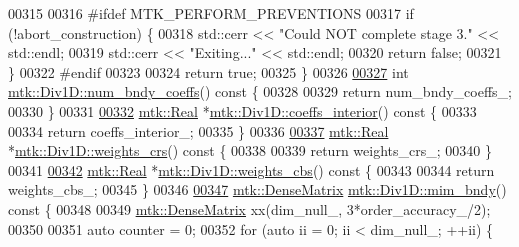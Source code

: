 \begin{DoxyCode}
{{00315 
00316 \textcolor{preprocessor}{  #ifdef MTK\_PERFORM\_PREVENTIONS}
00317   \textcolor{keywordflow}{if} (!abort\_construction) \{
00318     std::cerr << \textcolor{stringliteral}{"Could NOT complete stage 3."} << std::endl;
00319     std::cerr << \textcolor{stringliteral}{"Exiting..."} << std::endl;
00320     \textcolor{keywordflow}{return} \textcolor{keyword}{false};
00321   \}
00322 \textcolor{preprocessor}{  #endif}
00323 
00324   \textcolor{keywordflow}{return} \textcolor{keyword}{true};
00325 \}
00326 
\hypertarget{mtk__div__1d_8cc_source_l00327}{}\hyperlink{classmtk_1_1Div1D_a975cb2a91ed6806f6fc0a3a5b01b01b1}{00327} \textcolor{keywordtype}{int} \hyperlink{classmtk_1_1Div1D_a975cb2a91ed6806f6fc0a3a5b01b01b1}{mtk::Div1D::num\_bndy\_coeffs}()\textcolor{keyword}{ const }\{
00328 
00329   \textcolor{keywordflow}{return} num\_bndy\_coeffs\_;
00330 \}
00331 
\hypertarget{mtk__div__1d_8cc_source_l00332}{}\hyperlink{classmtk_1_1Div1D_a0916b5e84b019b4b6a33d0a45d829513}{00332} \hyperlink{group__c01-roots_gac080bbbf5cbb5502c9f00405f894857d}{mtk::Real} *\hyperlink{classmtk_1_1Div1D_a0916b5e84b019b4b6a33d0a45d829513}{mtk::Div1D::coeffs\_interior}()\textcolor{keyword}{ const }\{
00333 
00334   \textcolor{keywordflow}{return} coeffs\_interior\_;
00335 \}
00336 
\hypertarget{mtk__div__1d_8cc_source_l00337}{}\hyperlink{classmtk_1_1Div1D_ab5c791285e7e51a85b8c62a1b0ab9126}{00337} \hyperlink{group__c01-roots_gac080bbbf5cbb5502c9f00405f894857d}{mtk::Real} *\hyperlink{classmtk_1_1Div1D_ab5c791285e7e51a85b8c62a1b0ab9126}{mtk::Div1D::weights\_crs}()\textcolor{keyword}{ const }\{
00338 
00339   \textcolor{keywordflow}{return} weights\_crs\_;
00340 \}
00341 
\hypertarget{mtk__div__1d_8cc_source_l00342}{}\hyperlink{classmtk_1_1Div1D_a5d4fe8c61ce41cb1134a3f9cb16deb59}{00342} \hyperlink{group__c01-roots_gac080bbbf5cbb5502c9f00405f894857d}{mtk::Real} *\hyperlink{classmtk_1_1Div1D_a5d4fe8c61ce41cb1134a3f9cb16deb59}{mtk::Div1D::weights\_cbs}()\textcolor{keyword}{ const }\{
00343 
00344   \textcolor{keywordflow}{return} weights\_cbs\_;
00345 \}
00346 
\hypertarget{mtk__div__1d_8cc_source_l00347}{}\hyperlink{classmtk_1_1Div1D_a2c844ef39825e73e4024d35fcdd42b12}{00347} \hyperlink{classmtk_1_1DenseMatrix}{mtk::DenseMatrix} \hyperlink{classmtk_1_1Div1D_a2c844ef39825e73e4024d35fcdd42b12}{mtk::Div1D::mim\_bndy}()\textcolor{keyword}{ const }\{
00348 
00349   \hyperlink{classmtk_1_1DenseMatrix}{mtk::DenseMatrix} xx(dim\_null\_, 3*order\_accuracy\_/2);
00350 
00351   \textcolor{keyword}{auto} counter = 0;
00352   \textcolor{keywordflow}{for} (\textcolor{keyword}{auto} ii = 0; ii < dim\_null\_; ++ii) \{
}}
\end{DoxyCode}

